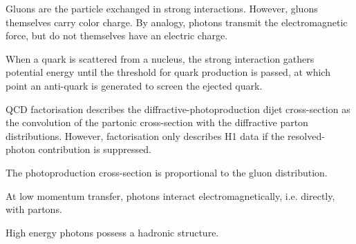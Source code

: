 Gluons are the particle exchanged in strong interactions. However, gluons themselves carry color charge. By analogy, photons transmit the electromagnetic force, but do not themselves have an electric charge. 

When a quark is scattered from a nucleus, the strong interaction gathers potential energy until the threshold for quark production is passed, at which point an anti-quark is generated to screen the ejected quark.

QCD factorisation describes the diffractive-photoproduction dijet cross-section as the convolution of the partonic cross-section with the diffractive parton distributions. However, factorisation only describes H1 data if the resolved-photon contribution is suppressed. 

The photoproduction cross-section is proportional to the gluon distribution.

At low momentum transfer, photons interact electromagnetically, i.e. directly, with partons. 

High energy photons possess a hadronic structure. 